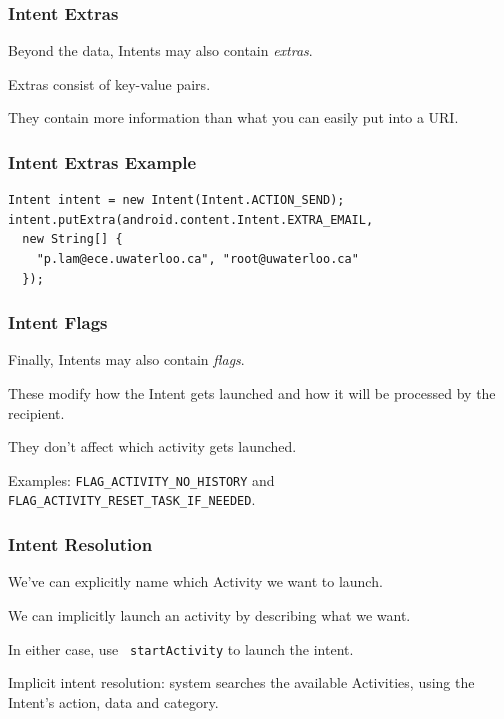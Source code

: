\begin{frame}
\frametitle{Intent Extras}
\begin{changemargin}{1cm}

Beyond the data, Intents may also contain \emph{extras}. 

Extras
consist of key-value pairs. 

They contain more information than what you
can easily put into a URI.

\end{changemargin}
\end{frame}


\begin{frame}[fragile]
\frametitle{Intent Extras Example}
\begin{changemargin}{1cm}

{\small 
\begin{verbatim}
Intent intent = new Intent(Intent.ACTION_SEND);
intent.putExtra(android.content.Intent.EXTRA_EMAIL,
  new String[] {
    "p.lam@ece.uwaterloo.ca", "root@uwaterloo.ca"
  });
\end{verbatim}
}


\end{changemargin}
\end{frame}



\begin{frame}
\frametitle{Intent Flags}
\begin{changemargin}{1cm}

Finally, Intents may also contain \emph{flags}.

These modify how the
Intent gets launched and how it will be processed by the recipient. 


They don't affect which activity gets launched. 

Examples: {\tt FLAG\_ACTIVITY\_NO\_HISTORY} and 
{\tt FLAG\_ACTIVITY\_RESET\_TASK\_IF\_NEEDED}.

\end{changemargin}
\end{frame}


\begin{frame}
\frametitle{Intent Resolution}
\begin{changemargin}{1cm}
We've can explicitly name which Activity we want to launch.

We can implicitly launch an activity by
describing what we want. 

In either case, use {\tt
  startActivity}  to launch the intent.

Implicit intent resolution: system searches the
available Activities, using the Intent's action, data
and category.

\end{changemargin}
\end{frame}

